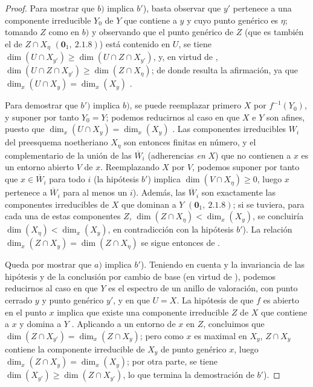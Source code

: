 \begin{proof}
Para mostrar que $b)$ implica $b'$), basta observar que $y'$ pertenece a una componente irreducible $Y_0$ de $Y$ que contiene a $y$ y cuyo punto genérico es $\eta$; tomando $Z$ como en $b)$ y observando que el punto genérico de $Z$ (que es también el de $Z\cap X_\eta$ $(\mathbf{0}_1,~2.1.8)$) está contenido en $U$, se tiene $\dim(U\cap X_{y'})\geq\dim(U\cap Z\cap X_{y'})$, y, en virtud de , $\dim(U\cap Z\cap X_{y'})\geq\dim(Z\cap X_\eta)$; de donde resulta la afirmación, ya que $\dim_x(U\cap X_y)=\dim_x(X_y)$ .

Para demostrar que $b')$ implica $b)$, se puede reemplazar primero $X$ por $f^{-1}(Y_0)$, y suponer por tanto $Y_0=Y$; podemos reducirnos al caso en que $X$ e $Y$ son afines, puesto que $\dim_x(U\cap X_y)=\dim_x(X_y)$ .
Las componentes irreducibles $W_i$ del preesquema noetheriano $X_\eta$ son entonces finitas en número, y el complementario de la unión de las $\overline{W}_i$ (adherencias \emph{en} $X$) que no contienen a $x$ es un entorno abierto $V$ de $x$.
Reemplazando $X$ por $V$, podemos suponer por tanto que $x\in\overline{W}_i$ para todo $i$ (la hipótesis $b'$) implica $\dim(V\cap X_\eta)\geq 0$, luego $x$ pertenece a $\overline{W}_i$ para al menos un $i$).
Además, las $\overline{W}_i$ son exactamente las componentes irreducibles de $X$ que dominan a $Y$ $(\mathbf{0}_1,~2.1.8)$; si se tuviera, para cada una de estas componentes $Z$, $\dim(Z\cap X_\eta)<\dim_x(X_y)$, se concluiría $\dim(X_\eta)<\dim_x(X_y)$, en contradicción con la hipótesis $b'$).
La relación $\dim_x(Z\cap X_y)=\dim(Z\cap X_\eta)$ se sigue entonces de .

Queda por mostrar que $a)$ implica $b'$).
Teniendo en cuenta  y la invariancia de las hipótesis y de la conclusión por cambio de base (en virtud de ), podemos reducirnos al caso en que $Y$ es el espectro de un anillo de valoración, con punto cerrado $y$ y punto genérico $y'$, y en que $U=X$.
La hipótesis de que $f$ es abierto en el punto $x$ implica que existe una componente irreducible $Z$ de $X$ que contiene a $x$ y domina a $Y$ .
Aplicando  a un entorno de $x$ en $Z$, concluimos que $\dim(Z\cap X_{y'})=\dim_x(Z\cap X_y)$; pero como $x$ es maximal en $X_y$, $Z\cap X_y$ contiene la componente irreducible de $X_y$ de punto genérico $x$, luego $\dim_x(Z\cap X_y)=\dim_x(X_y)$; por otra parte, se tiene $\dim(X_{y'})\geq\dim(Z\cap X_{y'})$, lo que termina la demostración de $b'$).
\end{proof}

